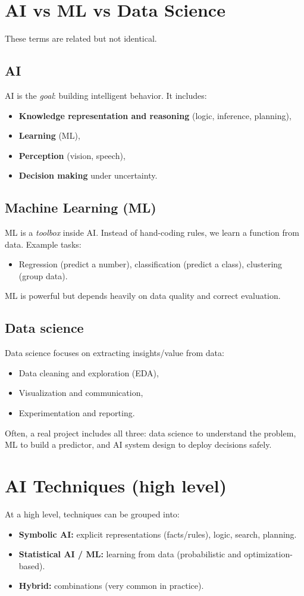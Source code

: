\documentclass[11pt]{article}
\begin{document}
\section{AI vs ML vs Data Science}
These terms are related but not identical.

\subsection{AI}
AI is the \emph{goal}: building intelligent behavior. It includes:
\begin{itemize}[leftmargin=*]
  \item \textbf{Knowledge representation and reasoning} (logic, inference, planning),
  \item \textbf{Learning} (ML),
  \item \textbf{Perception} (vision, speech),
  \item \textbf{Decision making} under uncertainty.
\end{itemize}

\subsection{Machine Learning (ML)}
ML is a \emph{toolbox} inside AI. Instead of hand-coding rules, we learn a function from data. Example tasks:
\begin{itemize}[leftmargin=*]
  \item Regression (predict a number), classification (predict a class), clustering (group data).
\end{itemize}
ML is powerful but depends heavily on data quality and correct evaluation.

\subsection{Data science}
Data science focuses on extracting insights/value from data:
\begin{itemize}[leftmargin=*]
  \item Data cleaning and exploration (EDA),
  \item Visualization and communication,
  \item Experimentation and reporting.
\end{itemize}
Often, a real project includes all three: data science to understand the problem, ML to build a predictor, and AI system design to deploy decisions safely.

\section{AI Techniques (high level)}
At a high level, techniques can be grouped into:
\begin{itemize}[leftmargin=*]
  \item \textbf{Symbolic AI:} explicit representations (facts/rules), logic, search, planning.
  \item \textbf{Statistical AI / ML:} learning from data (probabilistic and optimization-based).
  \item \textbf{Hybrid:} combinations (very common in practice).
\end{itemize}
\end{document}
